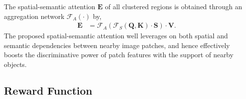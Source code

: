 \documentclass[letterpaper]{article} %
\newcommand\rjf[1]{\textcolor{red}{\{RJF: #1\}}}
\begin{document}
The spatial-semantic attention $\bm{E}$ of all clustered regions is obtained through an aggregation network $\mathcal{F}_{A}(\cdot)$ %
by,
\begin{align}
	\label{eqn:FA}
  \bm{E} &= \mathcal{F}_{A}(\mathcal{F}_{S}(\bm{Q},\bm{K}) \cdot \bm{S}) \cdot \bm{V}. 
\end{align}
The proposed spatial-semantic attention well leverages on both spatial and semantic dependencies between nearby image patches, %
and hence effectively boosts the discriminative power of patch features with the support of nearby objects. 


\subsection{Reward Function}
\label{sssec:reward}
\end{document}
